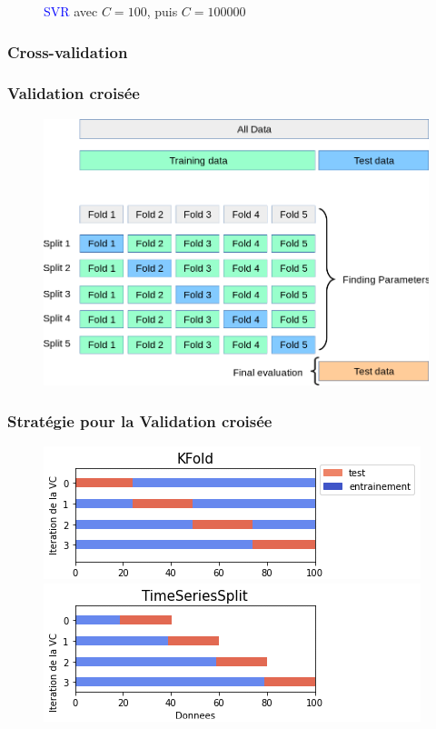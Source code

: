 \documentclass{beamer}[aspectratio = 43]
\begin{document}
\begin{frame}
\begin{figure}[h]
\begin{minipage}{0.5\textwidth}
		\end{minipage}
		\caption{\textcolor{blue}{SVR} avec $C=100$, puis $C=100000$}
	\end{figure}
\end{frame}

\subsubsection{Cross-validation}
\begin{frame}
	\frametitle{Validation croisée}
	\begin{figure}[b]
		\centering
		\includegraphics[scale=0.3]{gscv}
	\end{figure}
\end{frame}

\begin{frame}
	\frametitle{Stratégie pour la Validation croisée}
		\begin{figure}[h]
			\centering
			\includegraphics[scale=0.7]{kfold_}
			\includegraphics[scale=0.7]{tscv_}
		\end{figure}
\end{frame}
\end{document}

